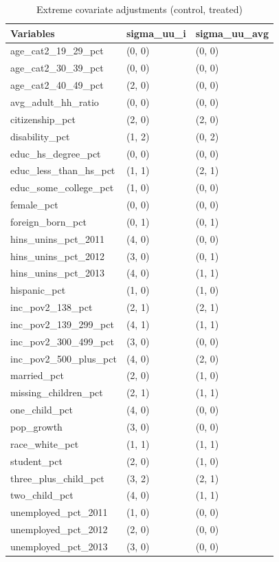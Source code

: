 \begin{table}[ht]
\centering
    \caption{Extreme covariate adjustments (control, treated)}
    \label{tab:extreme1}
\begin{tabular}{lll}
  \hline
Variables & sigma\_uu\_i & sigma\_uu\_avg \\ 
  \hline
age\_cat2\_19\_29\_pct & (0, 0) & (0, 0) \\ 
  age\_cat2\_30\_39\_pct & (0, 0) & (0, 0) \\ 
  age\_cat2\_40\_49\_pct & (2, 0) & (0, 0) \\ 
  avg\_adult\_hh\_ratio & (0, 0) & (0, 0) \\ 
  citizenship\_pct & (2, 0) & (2, 0) \\ 
  disability\_pct & (1, 2) & (0, 2) \\ 
  educ\_hs\_degree\_pct & (0, 0) & (0, 0) \\ 
  educ\_less\_than\_hs\_pct & (1, 1) & (2, 1) \\ 
  educ\_some\_college\_pct & (1, 0) & (0, 0) \\ 
  female\_pct & (0, 0) & (0, 0) \\ 
  foreign\_born\_pct & (0, 1) & (0, 1) \\ 
  hins\_unins\_pct\_2011 & (4, 0) & (0, 0) \\ 
  hins\_unins\_pct\_2012 & (3, 0) & (0, 1) \\ 
  hins\_unins\_pct\_2013 & (4, 0) & (1, 1) \\ 
  hispanic\_pct & (1, 0) & (1, 0) \\ 
  inc\_pov2\_138\_pct & (2, 1) & (2, 1) \\ 
  inc\_pov2\_139\_299\_pct & (4, 1) & (1, 1) \\ 
  inc\_pov2\_300\_499\_pct & (3, 0) & (0, 0) \\ 
  inc\_pov2\_500\_plus\_pct & (4, 0) & (2, 0) \\ 
  married\_pct & (2, 0) & (1, 0) \\ 
  missing\_children\_pct & (2, 1) & (1, 1) \\ 
  one\_child\_pct & (4, 0) & (0, 0) \\ 
  pop\_growth & (3, 0) & (0, 0) \\ 
  race\_white\_pct & (1, 1) & (1, 1) \\ 
  student\_pct & (2, 0) & (1, 0) \\ 
  three\_plus\_child\_pct & (3, 2) & (2, 1) \\ 
  two\_child\_pct & (4, 0) & (1, 1) \\ 
  unemployed\_pct\_2011 & (1, 0) & (0, 0) \\ 
  unemployed\_pct\_2012 & (2, 0) & (0, 0) \\ 
  unemployed\_pct\_2013 & (3, 0) & (0, 0) \\ 
   \hline
\end{tabular}
\end{table}

